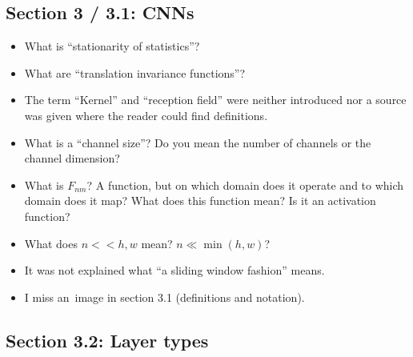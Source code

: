 \documentclass[a4paper,9pt]{scrartcl}
\begin{document}
\subsection{Section 3 / 3.1: CNNs}
\begin{itemize}
    \item What is \enquote{stationarity of statistics}?
    \item What are \enquote{translation invariance functions}?
    \item The term \enquote{Kernel} and \enquote{reception field} were neither
          introduced nor a source was given where the reader could find
          definitions.
    \item What is a \enquote{channel size}? Do you mean the number of channels
          or the channel dimension?
    \item What is $F_{nm}$? A function, but on which domain does it operate and
          to which domain does it map? What does this function mean? Is it
          an activation function?
    \item What does $n << h,w$ mean? $n \ll \min(h, w)$?
    \item It was not explained what \enquote{a sliding window fashion} means.
    \item I miss an~image in section 3.1 (definitions and notation).
\end{itemize}

\subsection{Section 3.2: Layer types}
\end{document}
